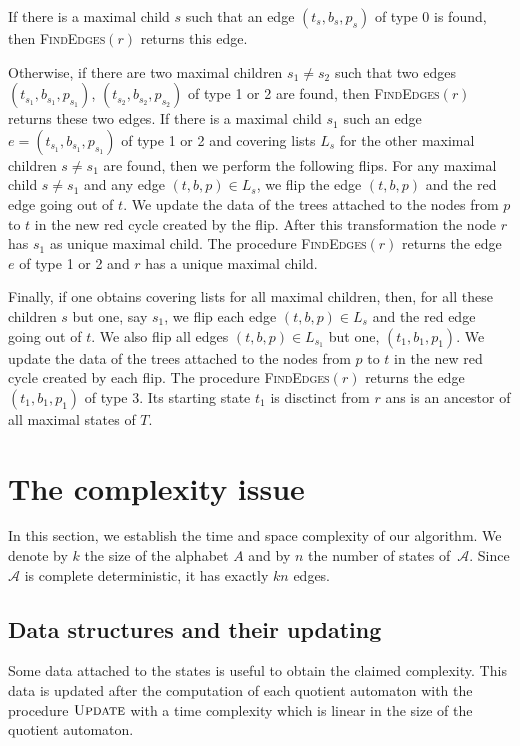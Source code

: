 \documentclass[11pt,a4paper]{article}
\def\A{\mathcal{A}}
\def\T{{T}}
\begin{document}
If there is a maximal child $s$ such that an edge $(t_s,b_s,p_s)$ of
type 0 is found, then \textsc{FindEdges}$(r)$ returns this
edge. 

Otherwise, if there are two maximal children $s_1 \neq s_2$ such
that two edges $(t_{s_1},b_{s_1},p_{s_1})$,
$(t_{s_2},b_{s_2},p_{s_2})$ of type 1 or 2 are found, then
\textsc{FindEdges}$(r)$ returns these two edges.  If there is a
maximal child $s_1$ such an edge $e=(t_{s_1},b_{s_1},p_{s_1})$ of type 1
or 2 and covering lists $L_s$ for the other maximal children $s \neq
s_1$ are found, then we perform the following flips. For any maximal
child $s \neq s_1$ and any edge $(t,b,p) \in L_s$, we flip the edge
$(t,b,p)$ and the red edge going out of $t$. We update the data of the
trees attached to the nodes from $p$ to $t$ in the new red cycle
created by the flip. After this transformation the node $r$ has $s_1$ as
unique maximal child. 
The procedure \textsc{FindEdges}$(r)$ returns the edge $e$ of type 
1 or 2  and $r$ has a unique maximal child.  

Finally, if one obtains covering lists for all maximal children, then,
for all these children $s$ but one, say $s_1$, we flip each edge
$(t,b,p) \in L_s$ and the red edge going out of $t$. We also flip all
edges $(t,b,p) \in L_{s_1}$ but one, $(t_1,b_1,p_1)$. We update the
data of the trees attached to the nodes from $p$ to $t$ in the new red
cycle created by each flip.  The procedure \textsc{FindEdges}$(r)$
returns the edge $(t_1,b_1,p_1)$ of type 3. Its starting state $t_1$
is disctinct from $r$ ans is an ancestor of all maximal states of $\T$.




\section{The complexity issue} \label{section.complexity}

In this section, we establish the time and space complexity of our
algorithm. We denote by $k$ the size of the alphabet $A$ and by $n$
the number of states of~$\A$.  Since $\A$ is complete deterministic,
it has exactly $kn$ edges.


\subsection{Data structures and their updating} \label{section.update}

Some data attached to the states is useful to obtain the claimed
complexity.  This data is updated after the computation of each
quotient automaton with the procedure $\textsc{Update}$ with a time
complexity which is linear in the size of the quotient automaton.
\end{document}
